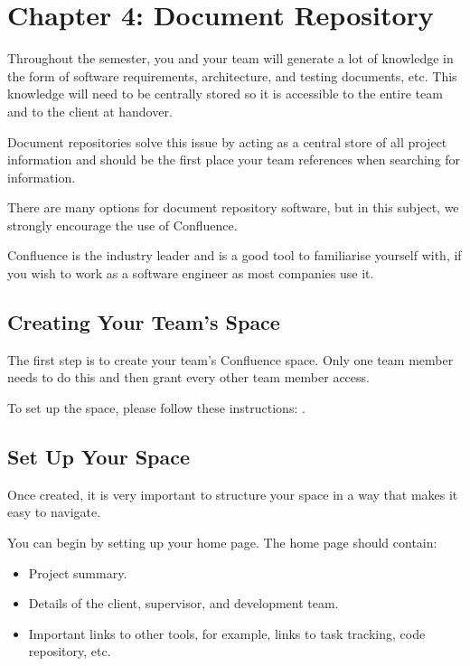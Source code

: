 \documentclass[letterpaper,10pt,english]{jupyterBook}
\begin{document}
\chapter{Chapter 4: Document Repository}
\label{\detokenize{chapter_4/document_repository:chapter-4-document-repository}}\label{\detokenize{chapter_4/document_repository::doc}}
\sphinxAtStartPar
Throughout the semester, you and your team will generate a lot of
knowledge \sphinxhyphen{} in the form of software requirements, architecture, and
testing documents, etc. This knowledge will need to be centrally stored
so it is accessible to the entire team and to the client at handover.

\sphinxAtStartPar
Document repositories solve this issue by acting as a central store of
all project information and should be the first place your team
references when searching for information.

\sphinxAtStartPar
There are many options for document repository software, but in this
subject, we strongly encourage the use of Confluence.

\sphinxAtStartPar
Confluence is the industry leader and is a good tool to familiarise
yourself with, if you wish to work as a software engineer as most
companies use it.


\section{Creating Your Team’s Space}
\label{\detokenize{chapter_4/document_repository:creating-your-team-s-space}}
\sphinxAtStartPar
The first step is to create your team’s Confluence space. Only one team
member needs to do this and then grant every other team member access.

\sphinxAtStartPar
To set up the space, please follow these instructions: .


\section{Set Up Your Space}
\label{\detokenize{chapter_4/document_repository:set-up-your-space}}
\sphinxAtStartPar
Once created, it is very important to structure your space in a way that
makes it easy to navigate.

\sphinxAtStartPar
You can begin by setting up your home page. The home page should
contain:
\begin{itemize}
\item {} 
\sphinxAtStartPar
Project summary.

\item {} 
\sphinxAtStartPar
Details of the client, supervisor, and development team.

\item {} 
\sphinxAtStartPar
Important links to other tools, for example, links to task tracking,
code repository, etc.

\end{itemize}
\end{document}
